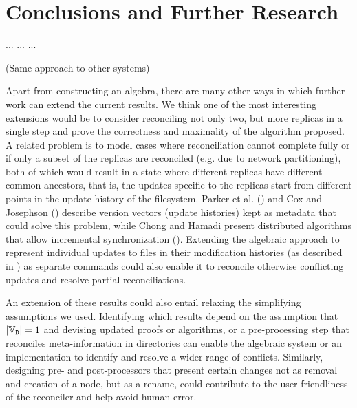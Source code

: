 
\section{Conclusions and Further Research}

... ... ...

(Same approach to other systems)
\medskip


Apart from constructing an algebra,
there are many other ways in which further work can extend the current results.
We think one of the most interesting extensions would be to
consider reconciling not only two, but more replicas in a single step and
prove the correctness and maximality of the algorithm proposed.
A related problem is to model cases where reconciliation cannot
complete fully
or if only a subset of the replicas are reconciled 
(e.g. due to network partitioning),
both of which would result in a state where different replicas
have different common ancestors, that is,
the updates specific to the replicas start from different points
in the update history of the filesystem.
Parker et al. (\cite{PPRS}) and Cox and Josephson (\cite{CJ})
describe version vectors (update histories) kept as metadata that could solve this problem,
while Chong and Hamadi present distributed algorithms that allow incremental synchronization (\cite{CH}).
Extending the algebraic approach to represent individual updates to files
in their modification histories (as described in \cite{CJ})
as separate commands could also enable it to reconcile otherwise
conflicting updates and resolve partial reconciliations.

An extension of these results could also entail relaxing
the simplifying assumptions we used.
Identifying which results depend on the assumption that $|\mathbb{V}_{\mathtt{D}}|=1$
and devising updated proofs or algorithms,
or a pre-processing step that reconciles meta-information in directories
can enable the algebraic system or an implementation
to identify and resolve a wider range of conflicts.
Similarly, designing pre- and post-processors that
present certain changes not as removal and creation of a node,
but as a rename,
could contribute to the user-friendliness of the reconciler
and help avoid human error.

